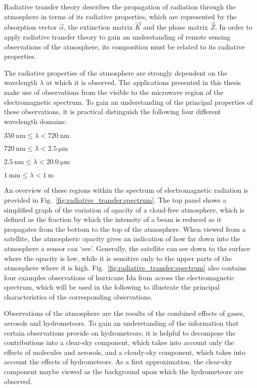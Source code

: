 Radiative transfer theory describes the propagation of radiation through the
atmosphere in terms of its radiative properties, which are represented by the
absorption vector $\vec{\alpha}$, the extinction matrix $\vec{K}$ and the phase
matrix $\vec{Z}$. In order to apply radiative transfer theory to gain an
understanding of remote sensing observations of the atmosphere, its composition
must be related to its radiative properties.

The radiative properties of the atmosphere are strongly dependent on the
wavelength $\lambda$ at which it is observed. The applications presented
in this thesis make use of observations from the visible to the microwave
region of the electromagnetic spectrum. To gain an understanding of the principal
properties of these observations, it is practical distinguish the following
four different wavelength domains:
\begin{description}[midpenalty=100000]
\item[Visible (VIS):] $\SI{350}{\nano \meter} \leq \lambda < \SI{720}{\nano \meter}$
\item[Near infrared (NIR):] $\SI{720}{\nano \meter} \leq \lambda < \SI{2.5}{\micro \meter}$
\item[Thermal infrared (TIR):] $\SI{2.5}{\nano \meter} \leq \lambda < \SI{20.0}{\micro \meter}$
\item[Microwave (MW):] $\SI{1}{\milli \meter} \leq \lambda < \SI{1}{ \meter}$
\end{description}
An overview of these regions within the spectrum of electromagnetic radiation is
provided in Fig.~\ref{fig:radiative_transfer:spectrum}. The top panel shows a
simplified graph of the variation of opacity of a cloud-free atmosphere, which
is defined as the fraction by which the intensity of a beam is reduced as it
propagates from the bottom to the top of the atmosphere. When viewed from a
satellite, the atmospheric opacity gives an indication of how far down into the
atmosphere a sensor can `see'. Generally, the satellite can see down to the
surface where the opacity is low, while it is sensitive only to the upper parts
of the atmosphere where it is high. Fig.~\ref{fig:radiative_transfer:spectrum}
also contains four examples observations of hurricane Ida from across the
electromagnetic spectrum, which will be used in the following to illustrate
the principal characteristics of the corresponding observations.

Observations of the atmosphere are the results of the combined effects of gases,
aerosols and hydrometeors. To gain an understanding of the information that
certain observations provide on hydrometeors, it is helpful to decompose the
contributions into a clear-sky component, which takes into account only the
effects of molecules and aerosols, and a cloudy-sky component, which takes into
account the effects of hydrometeors. As a first approximation, the clear-sky
component maybe viewed as the background upon which the hydrometeors are
observed.

